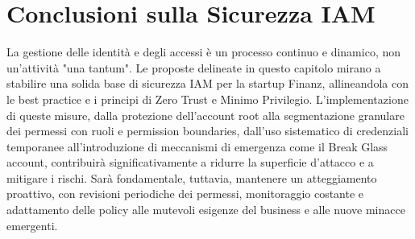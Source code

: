 \section{Conclusioni sulla Sicurezza IAM}
La gestione delle identità e degli accessi è un processo continuo e dinamico, non un'attività "una tantum". Le proposte delineate in questo capitolo mirano a stabilire una solida base di sicurezza IAM per la startup Finanz, allineandola con le best practice e i principi di Zero Trust e Minimo Privilegio. L'implementazione di queste misure, dalla protezione dell'account root alla segmentazione granulare dei permessi con ruoli e permission boundaries, dall'uso sistematico di credenziali temporanee all'introduzione di meccanismi di emergenza come il Break Glass account, contribuirà significativamente a ridurre la superficie d'attacco e a mitigare i rischi. Sarà fondamentale, tuttavia, mantenere un atteggiamento proattivo, con revisioni periodiche dei permessi, monitoraggio costante e adattamento delle policy alle mutevoli esigenze del business e alle nuove minacce emergenti.